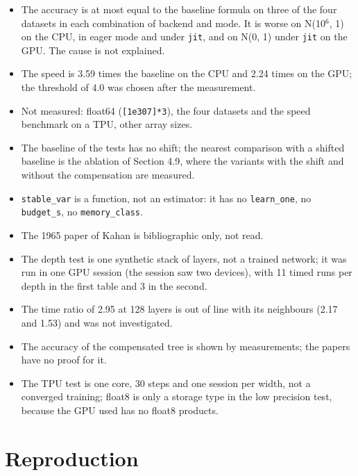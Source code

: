\documentclass[11pt]{article}
\begin{document}
\begin{itemize}
\item The accuracy is at most equal to the baseline formula on three of the four datasets in each combination of backend and mode. It is worse on N(10$^{6}$, 1) on the CPU, in eager mode and under \texttt{jit}, and on N(0, 1) under \texttt{jit} on the GPU. The cause is not explained.
\item The speed is 3.59 times the baseline on the CPU and 2.24 times on the GPU; the threshold of 4.0 was chosen after the measurement.
\item Not measured: float64 (\texttt{[1e307]*3}), the four datasets and the speed benchmark on a TPU, other array sizes.
\item The baseline of the tests has no shift; the nearest comparison with a shifted baseline is the ablation of Section 4.9, where the variants with the shift and without the compensation are measured.
\item \texttt{stable\_var} is a function, not an estimator: it has no \texttt{learn\_one}, no \texttt{budget\_s}, no \texttt{memory\_class}.
\item The 1965 paper of Kahan \cite{kahan1965} is bibliographic only, not read.
\item The depth test is one synthetic stack of layers, not a trained network; it was run in one GPU session (the session saw two devices), with 11 timed runs per depth in the first table and 3 in the second.
\item The time ratio of 2.95 at 128 layers is out of line with its neighbours (2.17 and 1.53) and was not investigated.
\item The accuracy of the compensated tree is shown by measurements; the papers have no proof for it.
\item The TPU test is one core, 30 steps and one session per width, not a converged training; float8 is only a storage type in the low precision test, because the GPU used has no float8 products.
\end{itemize}

\section{Reproduction}
\end{document}
